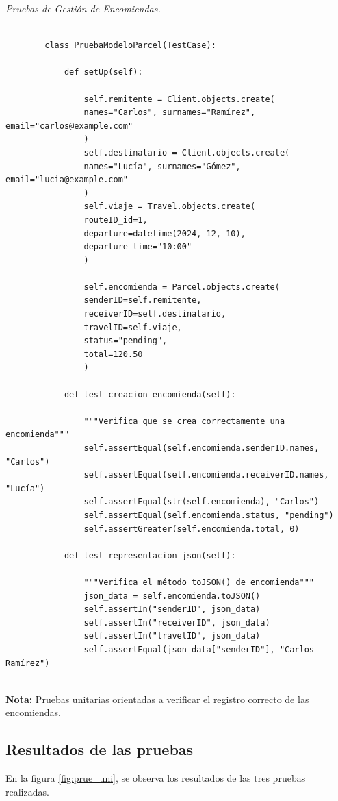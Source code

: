 	\textit{Pruebas de Gestión de Encomiendas.} %
	\vspace{0.3cm} %
	\begin{lstlisting}[lineskip=-1pt]
		
		class PruebaModeloParcel(TestCase):
		
			def setUp(self):
			
				self.remitente = Client.objects.create(
				names="Carlos", surnames="Ramírez", email="carlos@example.com"
				)
				self.destinatario = Client.objects.create(
				names="Lucía", surnames="Gómez", email="lucia@example.com"
				)
				self.viaje = Travel.objects.create(
				routeID_id=1,
				departure=datetime(2024, 12, 10),
				departure_time="10:00"
				)
				
				self.encomienda = Parcel.objects.create(
				senderID=self.remitente,
				receiverID=self.destinatario,
				travelID=self.viaje,
				status="pending",
				total=120.50
				)
			
			def test_creacion_encomienda(self):
			
				"""Verifica que se crea correctamente una encomienda"""
				self.assertEqual(self.encomienda.senderID.names, "Carlos")
				self.assertEqual(self.encomienda.receiverID.names, "Lucía")
				self.assertEqual(str(self.encomienda), "Carlos")
				self.assertEqual(self.encomienda.status, "pending")
				self.assertGreater(self.encomienda.total, 0)
			
			def test_representacion_json(self):
			
				"""Verifica el método toJSON() de encomienda"""
				json_data = self.encomienda.toJSON()
				self.assertIn("senderID", json_data)
				self.assertIn("receiverID", json_data)
				self.assertIn("travelID", json_data)
				self.assertEqual(json_data["senderID"], "Carlos Ramírez")
				
	\end{lstlisting}
	
	\textbf{Nota:} Pruebas unitarias orientadas a verificar el registro correcto de las encomiendas.
		
	\subsection{Resultados de las pruebas}
	
	En la figura \ref{fig:prue_uni}, se observa los resultados de las tres pruebas realizadas.
	
	\vspace{0.2cm} %
	
